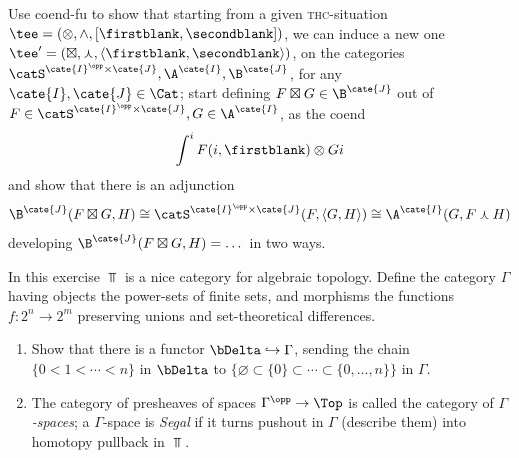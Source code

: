 \begin{exerciseset}
\begin{exercisepoints}
\item \label{ex4:lifted-thc} Use coend-fu to show that starting from a given \textsc{thc}-situation $\tee=(\otimes , \wedge, [\firstblank,\secondblank])$, we can induce a new one $\tee' = (\boxtimes, \curlywedge, \langle\firstblank,\secondblank\rangle )$, on the categories $\catS^{\cate{I}^\opp\times \cate{J}}, \A^\cate{I}, \B^\cate{J}$, for any $\cate{I}, \cate{J}\in\Cat$; start defining $F\boxtimes G\in \B^\cate{J}$ out of $F\in \catS^{\cate{I}^\opp\times \cate{J}}, G\in \A^\cate{I}$, as the coend 
\[
\int^i F(i, \firstblank)\otimes Gi
\] 
and show that there is an adjunction
\[
{\B^\cate{J}}(F\boxtimes G, H)\cong {\catS^{\cate{I}^\opp\times \cate{J}}}(F, \langle G,H\rangle )\cong {\A^\cate{I}}(G, F\curlywedge H)
\]
developing ${\B^\cate{J}}(F\boxtimes G, H) = \dots$ in two ways.
\item In this exercise $\Top$ is a nice category for algebraic topology. Define the category $\Gamma$  having objects the power-sets of finite sets, and morphisms the functions $f\colon 2^n\to 2^m$ preserving unions and set-theoretical differences.
\begin{enumerate}
\item Show that there is a functor $\bDelta\hookrightarrow \Gamma$, sending the chain  $\{0<1<\cdots<n\}$ in $\bDelta$ to $\{\varnothing\subset \{0\}\subset\cdots\subset \{0,\dots,n\}\}$ in $\Gamma$.
\item The category of presheaves of spaces $\Gamma^\opp\to \Top$ is called the category of \emph{$\Gamma$-spaces}; a $\Gamma$-space is \emph{Segal} if it turns pushout in $\Gamma$ (describe them) into homotopy pullback in $\Top$.


\end{enumerate}
\end{exercisepoints}
\end{exerciseset}
